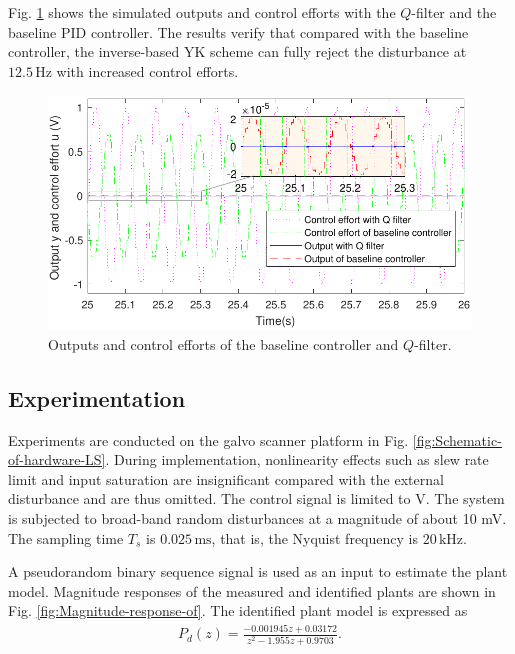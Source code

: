 \documentclass [11pt, proquest] {uwthesis}[2020/02/24]
\begin{document}
Fig. \ref{fig:Output-of-the} shows the simulated outputs and control
efforts with the $Q$-filter and the baseline PID controller. The
results verify that compared with the baseline controller, the inverse-based
YK scheme can fully reject the disturbance at $12.5\,\text{Hz}$ with
increased control efforts.
\begin{figure}[!ht]
\begin{centering}
\includegraphics[width=13cm]{Loop-shaping/Q_output_3}
\par\end{centering}
\caption{\label{fig:Output-of-the}Outputs and control efforts of the baseline
controller and $Q$-filter.}
\end{figure}

\subsection{\label{subsec:Experimentation}Experimentation}

Experiments are conducted on the galvo scanner platform \cite{wang2016spectral}
in Fig. \ref{fig:Schematic-of-hardware-LS}. During implementation,
nonlinearity effects such as slew rate limit and input saturation
are insignificant compared with the external disturbance and are thus
omitted. The control signal is limited to  V. The
system is subjected to broad-band random disturbances at a magnitude
of about 10 mV. The sampling time $T_{s}$ is $0.025\,\text{ms}$,
that is, the Nyquist frequency is $20\,\text{kHz}$. 

A pseudorandom binary sequence signal is used as an input to estimate
the plant model. Magnitude responses of the measured and identified
plants are shown in Fig. \ref{fig:Magnitude-response-of}. The identified
plant model is expressed as
\begin{gather}
P_{d}(z)=\frac{-0.001945z+0.03172}{z^{2}-1.955z+0.9703}.\label{eq:identified_P}
\end{gather}
\end{document}
